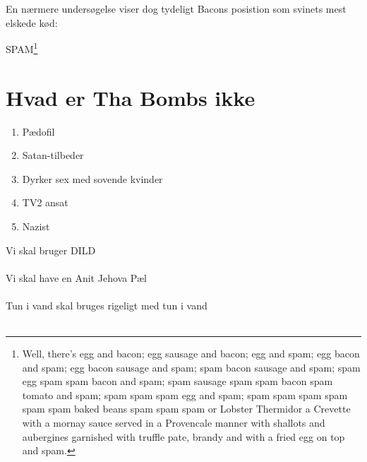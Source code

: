 En nærmere undersøgelse viser dog tydeligt Bacons posistion som svinets mest elskede kød:

SPAM\footnote{Well, there's egg and bacon; egg sausage and bacon; egg and spam; egg bacon and spam; egg bacon sausage and spam; spam bacon sausage and spam; spam egg spam spam bacon and spam; spam sausage spam spam bacon spam tomato and spam; spam spam spam egg and spam; spam spam spam spam spam spam baked beans spam spam spam or Lobster Thermidor a Crevette with a mornay sauce served in a Provencale manner with shallots and aubergines garnished with truffle pate, brandy and with a fried egg on top and spam.}



\section{Hvad er Tha Bombs ikke}
\begin{enumerate}
\item Pædofil \cite{bib:url:Finn:Pedo}
\item Satan-tilbeder \cite{bib:url:Finn:Satan}
\item Dyrker sex med sovende kvinder \cite{bib:url:Finn:SovendeKvinder}
\item TV2 ansat \cite{bib:url:Finn:TV2}
\item Nazist\cite{bib:url:Finn:Nazist}
\end{enumerate}


Vi skal bruger DILD\cite{bib:url:Reklame:Dild}
\\
\\
Vi skal have en Anit Jehova Pæl \cite{bib:url:Reklame:Anti}
\\
\\
Tun i vand skal bruges \cite{bib:url:Reklame:Tun} rigeligt med tun i vand
\\
\\

